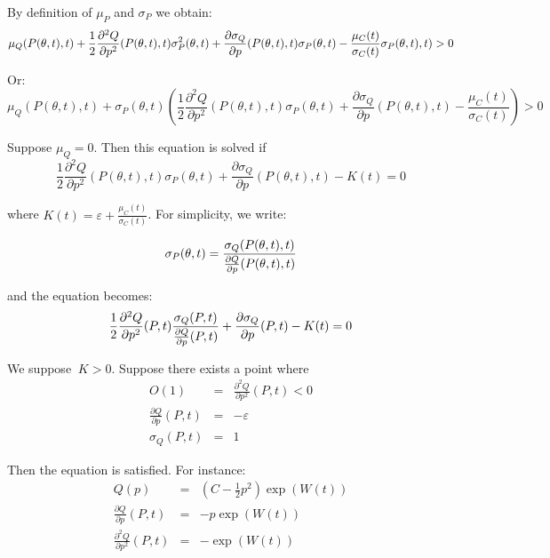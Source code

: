 \documentclass{article}
\begin{document}
By definition of $\mu _{P}$ and $\sigma _{P}$ we obtain:%
\begin{equation*}
\mu _{Q}(P(\theta ,t),t)+\frac{1}{2}\frac{\partial ^{2}Q}{\partial p^{2}}%
(P(\theta ,t),t)\sigma _{P}^{2}(\theta ,t)+\frac{\partial \sigma _{Q}}{%
\partial p}(P(\theta ,t),t)\sigma _{P}(\theta ,t)-\frac{\mu _{C}(t)}{\sigma
_{C}(t)}\sigma _{P}(\theta ,t),t)>0
\end{equation*}

Or:%
\begin{equation*}
\mu _{Q}(P(\theta ,t),t)+\sigma _{P}(\theta ,t)(\frac{1}{2}\frac{\partial
^{2}Q}{\partial p^{2}}(P(\theta ,t),t)\sigma _{P}(\theta ,t)+\frac{\partial
\sigma _{Q}}{\partial p}(P(\theta ,t),t)-\frac{\mu _{C}(t)}{\sigma _{C}(t)}%
)>0
\end{equation*}

Suppose $\mu _{Q}=0$. Then this equation is solved if%
\begin{equation*}
\frac{1}{2}\frac{\partial ^{2}Q}{\partial p^{2}}(P(\theta ,t),t)\sigma
_{P}(\theta ,t)+\frac{\partial \sigma _{Q}}{\partial p}(P(\theta
,t),t)-K(t)=0
\end{equation*}

where $K(t)=\varepsilon +\frac{\mu _{C}(t)}{\sigma _{C}(t)}$. For
simplicity, we write:

\begin{equation*}
\sigma _{P}(\theta ,t)=\frac{\sigma _{Q}(P(\theta ,t),t)}{\frac{\partial Q}{%
\partial p}(P(\theta ,t),t)}
\end{equation*}

and the equation becomes:%
\begin{equation}
\frac{1}{2}\frac{\partial ^{2}Q}{\partial p^{2}}(P,t)\frac{\sigma _{Q}(P,t)}{%
\frac{\partial Q}{\partial p}(P,t)}+\frac{\partial \sigma _{Q}}{\partial p}%
(P,t)-K(t)=0  \label{bofio}
\end{equation}

We suppose $\ K>0$. Suppose there exists a point where 
\begin{eqnarray*}
O(1) &=&\frac{\partial ^{2}Q}{\partial p^{2}}(P,t)<0 \\
\frac{\partial Q}{\partial p}(P,t) &=&-\varepsilon \\
\sigma _{Q}(P,t) &=&1
\end{eqnarray*}

Then the equation is satisfied. For instance:%
\begin{eqnarray*}
Q(p) &=&(C-\frac{1}{2}p^{2})\exp (W(t)) \\
\frac{\partial Q}{\partial p}(P,t) &=&-p\exp (W(t)) \\
\frac{\partial ^{2}Q}{\partial p^{2}}(P,t) &=&-\exp (W(t))
\end{eqnarray*}
\end{document}
